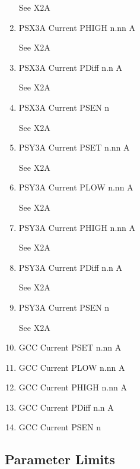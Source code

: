 \documentclass[11pt]{book}		%
\begin{document}
\begin{enumerate}
\color{red}
See X2A
\color{black}

 \item PSX3A Current PHIGH n.nn A

\color{red}
See X2A
\color{black}

 \item PSX3A Current PDiff n.n A

\color{red}
See X2A
\color{black}

 \item PSX3A Current PSEN  n

\color{red}
See X2A
\color{black}

 \item PSY3A Current PSET  n.nn A

\color{red}
See X2A
\color{black}

 \item PSY3A Current PLOW  n.nn A

\color{red}
See X2A
\color{black}

 \item PSY3A Current PHIGH n.nn A

\color{red}
See X2A
\color{black}

 \item PSY3A Current PDiff n.n A

\color{red}
See X2A
\color{black}

 \item PSY3A Current PSEN  n

\color{red}
See X2A
\color{black}

 \item GCC Current PSET  n.nn A
 \item GCC Current PLOW  n.nn A
 \item GCC Current PHIGH n.nn A
 \item GCC Current PDiff n.n A
 \item GCC Current PSEN  n
\end{enumerate}


\subsection{Parameter Limits} \label{sect:cyc-op-interface-status-beamline-fc1totarget-analog-control-limits}
\end{document}
